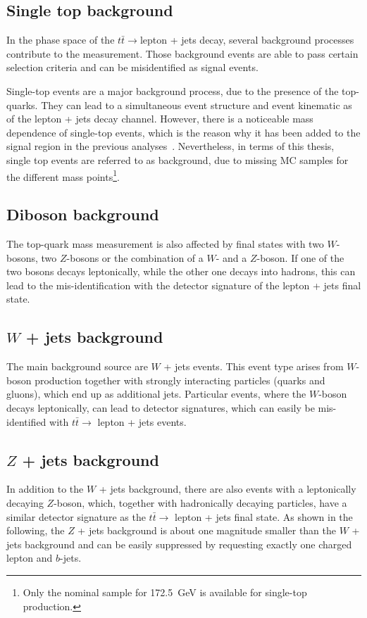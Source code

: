  
 \subsection{Single top background}
 
 In the phase space of the $t\bar{t} \rightarrow$lepton + jets decay, several background processes contribute to the measurement.  Those background events are able to pass certain selection criteria and can be misidentified as signal events.
 
 Single-top events are a major background process, due to the presence of the top-quarks. They can lead to a simultaneous event structure and  event kinematic as of the lepton + jets  decay channel. However, there is a noticeable mass dependence of single-top events, which is the reason why it has been added to the signal region in the previous analyses~\cite{ATLAS-CONF-2017-071, Aad:2015nba}. Nevertheless, in terms of this thesis, single top events are referred to as background, due to missing MC samples for the different mass points\footnote{Only the nominal sample for 172.5~GeV is available for single-top production.}. 
 
 \subsection{Diboson background}
 The top-quark mass measurement is also affected by final states with two $W$-bosons, two $Z$-bosons or the combination of a $W$- and a $Z$-boson.  If one of the two bosons decays leptonically, while the other one decays into hadrons, this can lead to the mis-identification with the detector signature of the lepton + jets final state.  
 

 \subsection{$W$ + jets background}
The main background source  are $W$ + jets events. This event type arises from $W$-boson production together with strongly interacting particles (quarks and gluons), which end up as additional jets. Particular events, where the $W$-boson decays leptonically, can lead to detector signatures, which can easily be mis-identified with $t\bar{t} \rightarrow$ lepton + jets events.



 \subsection{$Z$ + jets background} 
In addition to the $W$ + jets background, there are also events with a leptonically decaying $Z$-boson, which, together with hadronically decaying particles, have a similar detector signature as the  $t\bar{t} \rightarrow$ lepton + jets final state. As shown in the following, the $Z$ + jets background is about one magnitude smaller than the $W$ + jets background and can be easily suppressed by requesting exactly one charged lepton and $b$-jets.



